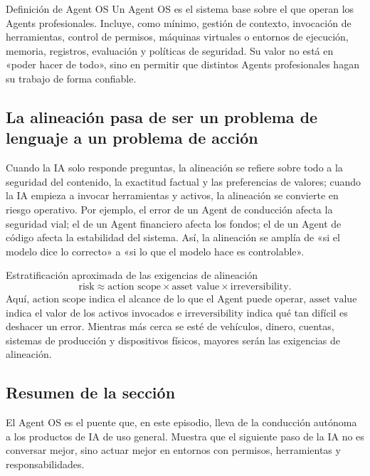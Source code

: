 \begin{importantbox}{Definición de Agent OS}
Un Agent OS es el sistema base sobre el que operan los Agents profesionales. Incluye, como mínimo, gestión de contexto, invocación de herramientas, control de permisos, máquinas virtuales o entornos de ejecución, memoria, registros, evaluación y políticas de seguridad. Su valor no está en «poder hacer de todo», sino en permitir que distintos Agents profesionales hagan su trabajo de forma confiable.
\end{importantbox}

\subsection{La alineación pasa de ser un problema de lenguaje a un problema de acción}

Cuando la IA solo responde preguntas, la alineación se refiere sobre todo a la seguridad del contenido, la exactitud factual y las preferencias de valores; cuando la IA empieza a invocar herramientas y activos, la alineación se convierte en riesgo operativo. Por ejemplo, el error de un Agent de conducción afecta la seguridad vial; el de un Agent financiero afecta los fondos; el de un Agent de código afecta la estabilidad del sistema. Así, la alineación se amplía de «si el modelo dice lo correcto» a «si lo que el modelo hace es controlable».

\begin{knowledgebox}{Estratificación aproximada de las exigencias de alineación}
\[
\text{risk} \approx \text{action scope} \times \text{asset value} \times \text{irreversibility}.
\]
Aquí, \(\text{action scope}\) indica el alcance de lo que el Agent puede operar, \(\text{asset value}\) indica el valor de los activos invocados e \(\text{irreversibility}\) indica qué tan difícil es deshacer un error. Mientras más cerca se esté de vehículos, dinero, cuentas, sistemas de producción y dispositivos físicos, mayores serán las exigencias de alineación.
\end{knowledgebox}

\subsection{Resumen de la sección}

El Agent OS es el puente que, en este episodio, lleva de la conducción autónoma a los productos de IA de uso general. Muestra que el siguiente paso de la IA no es conversar mejor, sino actuar mejor en entornos con permisos, herramientas y responsabilidades.

